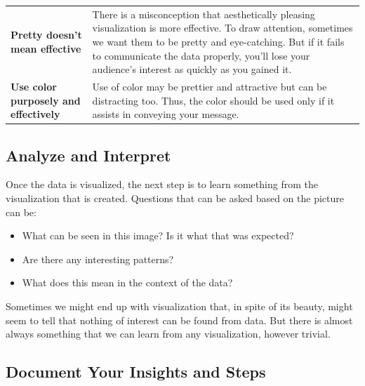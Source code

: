 \documentclass[]{book}
\providecommand{\tightlist}{%
  \setlength{\itemsep}{0pt}\setlength{\parskip}{0pt}}
\theoremstyle{definition}
\theoremstyle{definition}
\theoremstyle{definition}
\theoremstyle{remark}
\begin{document}
\begin{longtable}[]{@{}ll@{}}
\begin{minipage}[t]{0.16\columnwidth}
\textbf{Pretty doesn't mean effective}\strut
\end{minipage} & \begin{minipage}[t]{0.78\columnwidth}\raggedright\strut
There is a misconception that aesthetically pleasing visualization is
more effective. To draw attention, sometimes we want them to be pretty
and eye-catching. But if it fails to communicate the data properly,
you'll lose your audience's interest as quickly as you gained it.\strut
\end{minipage}\tabularnewline
\begin{minipage}[t]{0.16\columnwidth}\raggedright\strut
\textbf{Use color purposely and effectively}\strut
\end{minipage} & \begin{minipage}[t]{0.78\columnwidth}\raggedright\strut
Use of color may be prettier and attractive but can be distracting too.
Thus, the color should be used only if it assists in conveying your
message.\strut
\end{minipage}\tabularnewline
\bottomrule
\end{longtable}

\subsection{Analyze and Interpret}\label{analyze-and-interpret}

Once the data is visualized, the next step is to learn something from
the visualization that is created. Questions that can be asked based on
the picture can be:

\begin{itemize}
\tightlist
\item
  What can be seen in this image? Is it what that was expected?
\item
  Are there any interesting patterns?
\item
  What does this mean in the context of the data?
\end{itemize}

Sometimes we might end up with visualization that, in spite of its
beauty, might seem to tell that nothing of interest can be found from
data. But there is almost always something that we can learn from any
visualization, however trivial.

\subsection{Document Your Insights and
Steps}\label{document-your-insights-and-steps}
\end{document}
